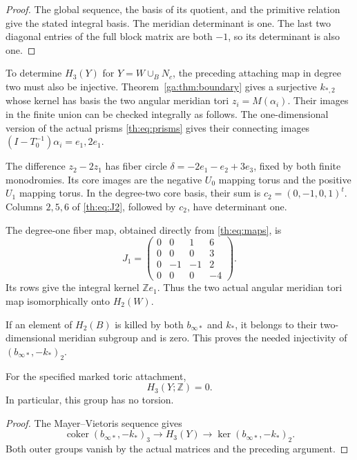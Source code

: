 \begin{proof}
The global sequence, the basis of its quotient, and the primitive relation
give the stated integral basis.
The meridian determinant is one.
The last two diagonal entries of the full block matrix are both $-1$,
so its determinant is also one.
\end{proof}

To determine $H_3(Y)$ for $Y=W\cup_BN_c$, the preceding attaching map
in degree two must also be injective.
Theorem~\ref{ga:thm:boundary} gives a surjective $k_{*,2}$ whose
kernel has basis the two angular meridian tori $z_i=M(\alpha_i)$.
Their images in the finite union can be checked integrally as follows.
The one-dimensional version of the actual prisms \eqref{th:eq:prisms}
gives their connecting images $(I-T_0^{-1})\alpha_i=e_1,2e_1$.

The difference $z_2-2z_1$ has fiber circle
$\delta=-2e_1-e_2+3e_3$, fixed by both finite monodromies.
Its core images are the negative $U_0$ mapping torus
and the positive $U_1$ mapping torus.
In the degree-two core basis, their sum is $c_2=(0,-1,0,1)^t$.
Columns $2,5,6$ of \eqref{th:eq:J2}, followed by $c_2$, have determinant one.

The degree-one fiber map, obtained directly from \eqref{th:eq:maps}, is
\[
J_1=\begin{pmatrix}0&0&1&6\\0&0&0&3\\0&-1&-1&2\\0&0&0&-4\end{pmatrix}.
\]
Its rows give the integral kernel $\mathbb Ze_1$.
Thus the two actual angular meridian tori map isomorphically onto $H_2(W)$.

If an element of $H_2(B)$ is killed by both $b_{\infty*}$ and $k_*$,
it belongs to their two-dimensional meridian subgroup and is zero.
This proves the needed injectivity of $(b_{\infty*},-k_*)_2$.

\begin{corollary}\label{th:cor:Y}
For the specified marked toric attachment,
\[
H_3(Y;\mathbb Z)=0.
\]
In particular, this group has no torsion.
\end{corollary}

\begin{proof}
The Mayer--Vietoris sequence gives
\[
\operatorname{coker}(b_{\infty*},-k_*)_3
\longrightarrow H_3(Y)
\longrightarrow\ker(b_{\infty*},-k_*)_2.
\]
Both outer groups vanish by the actual matrices and the preceding argument.
\end{proof}

